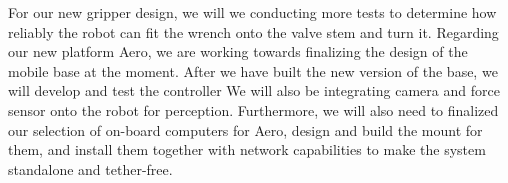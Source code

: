 \documentclass{standalone}
\begin{document}
For our new gripper design, we will we conducting more tests to
determine how reliably the robot can fit the wrench onto the valve
stem and turn it. Regarding our new platform Aero, we are working
towards finalizing the
design of the mobile base at the moment. After we have built the new
version of the base, we will develop and test the controller
We will also be integrating camera and force sensor onto
the robot for perception. Furthermore, we will also need to finalized
our selection of on-board computers for Aero, design and build the
mount for them, and install them together with network capabilities to
make the system standalone and tether-free.
\end{document}
